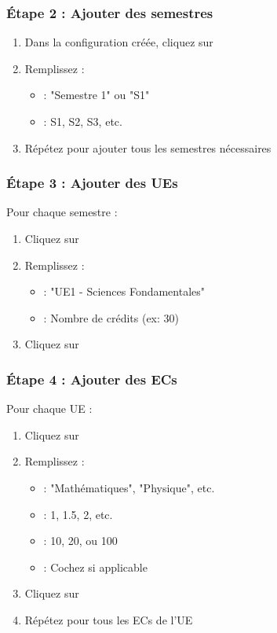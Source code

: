 \subsubsection{Étape 2 : Ajouter des semestres}

\begin{enumerate}[leftmargin=*]
    \item Dans la configuration créée, cliquez sur 
    \item Remplissez :
    \begin{itemize}
        \item {} : "Semestre 1" ou "S1"
        \item {} : S1, S2, S3, etc.
    \end{itemize}
    \item Répétez pour ajouter tous les semestres nécessaires
\end{enumerate}

\subsubsection{Étape 3 : Ajouter des UEs}

Pour chaque semestre :

\begin{enumerate}[leftmargin=*]
    \item Cliquez sur 
    \item Remplissez :
    \begin{itemize}
        \item {} : "UE1 - Sciences Fondamentales"
        \item {} : Nombre de crédits (ex: 30)
    \end{itemize}
    \item Cliquez sur 
\end{enumerate}

\subsubsection{Étape 4 : Ajouter des ECs}

Pour chaque UE :

\begin{enumerate}[leftmargin=*]
    \item Cliquez sur 
    \item Remplissez :
    \begin{itemize}
        \item {} : "Mathématiques", "Physique", etc.
        \item {} : 1, 1.5, 2, etc.
        \item {} : 10, 20, ou 100
        \item {} : Cochez si applicable
    \end{itemize}
    \item Cliquez sur 
    \item Répétez pour tous les ECs de l'UE
\end{enumerate}

